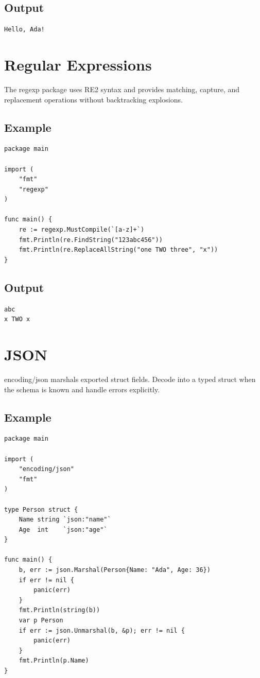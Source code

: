 \documentclass[10pt,oneside]{article}
\newcommand{\sectionline}{\par\vspace{4pt}{\color{rule}\hrule height .5pt}\vspace{7pt}\color{ink}\noindent}
\begin{document}
\subsection*{Output}
\begin{lstlisting}[style=terminal]
Hello, Ada!
\end{lstlisting}
\clearpage
\section{Regular Expressions}
\sectionline
The regexp package uses RE2 syntax and provides matching, capture, and replacement operations without backtracking explosions.\par
\subsection*{Example}
\begin{lstlisting}[style=gocode]
package main

import (
	"fmt"
	"regexp"
)

func main() {
	re := regexp.MustCompile(`[a-z]+`)
	fmt.Println(re.FindString("123abc456"))
	fmt.Println(re.ReplaceAllString("one TWO three", "x"))
}
\end{lstlisting}
\subsection*{Output}
\begin{lstlisting}[style=terminal]
abc
x TWO x
\end{lstlisting}
\clearpage
\section{JSON}
\sectionline
encoding/json marshals exported struct fields. Decode into a typed struct when the schema is known and handle errors explicitly.\par
\subsection*{Example}
\begin{lstlisting}[style=gocode]
package main

import (
	"encoding/json"
	"fmt"
)

type Person struct {
	Name string `json:"name"`
	Age  int    `json:"age"`
}

func main() {
	b, err := json.Marshal(Person{Name: "Ada", Age: 36})
	if err != nil {
		panic(err)
	}
	fmt.Println(string(b))
	var p Person
	if err := json.Unmarshal(b, &p); err != nil {
		panic(err)
	}
	fmt.Println(p.Name)
}
\end{lstlisting}
\end{document}
